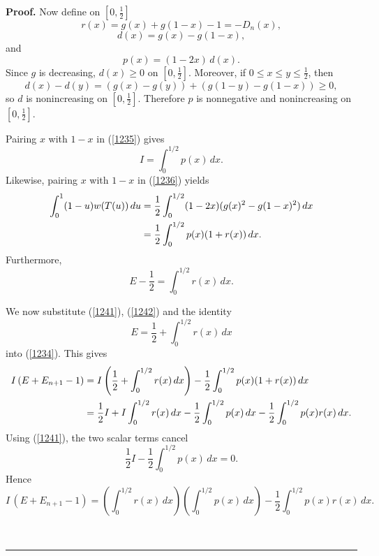 \documentclass[onecolumn]{article}
\newenvironment{proof}[1][Proof]{\noindent\textbf{#1.} }{\ \rule{0.5em}{0.5em}}
\begin{document}
\begin{proof}
Now define on $[0,\tfrac{1}{2}]$ 
\begin{equation}
r(x)=g(x)+g(1-x)-1=-D_{n}(x),  \label{1237}
\end{equation}%
\begin{equation}
d(x)=g(x)-g(1-x),  \label{1238}
\end{equation}%
and 
\begin{equation}
p(x)=(1-2x)\,d(x).  \label{1239}
\end{equation}%
Since $g$ is decreasing, $d(x)\geq 0$ on $[0,\tfrac{1}{2}]$. Moreover, if $%
0\leq x\leq y\leq \tfrac{1}{2}$, then 
\begin{equation}
d(x)-d(y)=(g(x)-g(y))+(g(1-y)-g(1-x))\geq 0,  \label{1240}
\end{equation}%
so $d$ is nonincreasing on $[0,\tfrac{1}{2}]$. Therefore $p$ is nonnegative
and nonincreasing on $[0,\tfrac{1}{2}]$.

Pairing $x$ with $1-x$ in (\ref{1235}) gives 
\begin{equation}
I=\int_{0}^{1/2}p(x)\,dx.  \label{1241}
\end{equation}%
Likewise, pairing $x$ with $1-x$ in (\ref{1236}) yields 
\begin{align}
\int_{0}^{1}(1-u)w(T(u))\,du& =\frac{1}{2}%
\int_{0}^{1/2}(1-2x)(g(x)^{2}-g(1-x)^{2})\,dx  \notag \\
& =\frac{1}{2}\int_{0}^{1/2}p(x)(1+r(x))\,dx.  \label{1242}
\end{align}%
Furthermore, 
\begin{equation}
E-\frac{1}{2}=\int_{0}^{1/2}r(x)\,dx.  \label{1243}
\end{equation}

We now substitute (\ref{1241}), (\ref{1242}) and the identity 
\begin{equation}
E=\frac{1}{2}+\int_{0}^{1/2}r(x)\,dx  \label{1244}
\end{equation}%
into (\ref{1234}). This gives 
\begin{align}
I\,(E+E_{n+1}-1)& =I\left( \frac{1}{2}+\int_{0}^{1/2}r(x)\,dx\right) -\frac{1%
}{2}\int_{0}^{1/2}p(x)(1+r(x))\,dx  \notag \\
& =\frac{1}{2}I+I\int_{0}^{1/2}r(x)\,dx-\frac{1}{2}\int_{0}^{1/2}p(x)\,dx-%
\frac{1}{2}\int_{0}^{1/2}p(x)r(x)\,dx.  \label{1245}
\end{align}%
Using (\ref{1241}), the two scalar terms cancel 
\begin{equation}
\frac{1}{2}I-\frac{1}{2}\int_{0}^{1/2}p(x)\,dx=0.  \label{1246}
\end{equation}%
Hence 
\begin{equation}
I\,(E+E_{n+1}-1)=\left( \int_{0}^{1/2}r(x)\,dx\right) \left(
\int_{0}^{1/2}p(x)\,dx\right) -\frac{1}{2}\int_{0}^{1/2}p(x)r(x)\,dx.
\label{1247}
\end{equation}


\end{proof}
\end{document}
